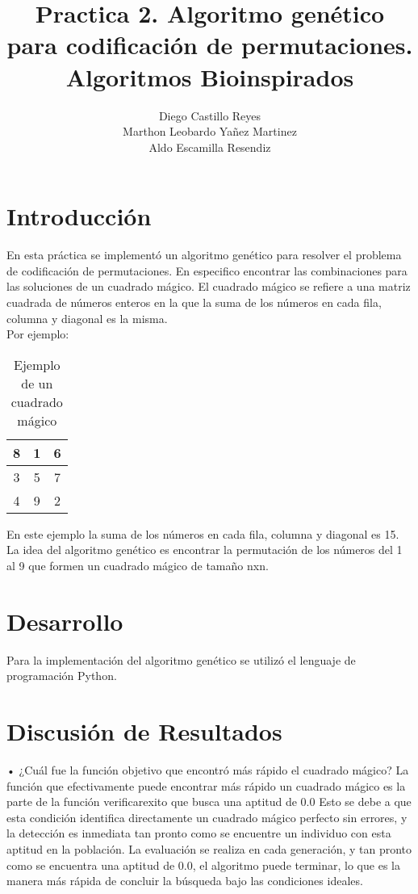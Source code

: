 \documentclass{report}
\title{\Huge{\textbf{Practica 2. Algoritmo genético para codificación de permutaciones.}}\\
\Large{\textbf{Algoritmos Bioinspirados}}}
\author{Diego Castillo Reyes\\Marthon Leobardo Yañez Martinez\\Aldo Escamilla Resendiz}
\begin{document}
    \maketitle
    \tableofcontents
    \newpage

    \section{Introducción}
    En esta práctica se implementó un algoritmo genético para resolver el problema de codificación de 
    permutaciones. En especifico encontrar las combinaciones para las soluciones de un cuadrado mágico.
    El cuadrado mágico se refiere a una matriz cuadrada de números enteros en la que la suma de los números 
    en cada fila, columna y diagonal es la misma.\\

    Por ejemplo: 
    \begin{table}[H]
        \centering
        \begin{tabular}{|c|c|c|}
            \hline
            8 & 1 & 6\\
            \hline
            3 & 5 & 7\\
            \hline
            4 & 9 & 2\\
            \hline
        \end{tabular}
        \caption{Ejemplo de un cuadrado mágico}
    \end{table}
    En este ejemplo la suma de los números en cada fila, columna y diagonal es 15.\\
    La idea del algoritmo genético es encontrar la permutación de los números del 
    1 al 9 que formen un cuadrado mágico de tamaño nxn.\\

    \section{Desarrollo}
    Para la implementación del algoritmo genético se utilizó el lenguaje de programación Python.
    
    \section{Discusión de Resultados}
    •  ¿Cuál fue la función objetivo que encontró más rápido el cuadrado mágico?
    La función que efectivamente puede encontrar más rápido un cuadrado mágico es la parte 
    de la función verificarexito que busca una aptitud de 0.0
    Esto se debe a que esta condición identifica directamente un cuadrado mágico perfecto sin errores, y la detección es inmediata 
    tan pronto como se encuentre un individuo con esta aptitud en la población. La evaluación se realiza en cada generación, 
    y tan pronto como se encuentra una aptitud de 0.0, el algoritmo puede terminar, lo que es la manera más rápida de concluir 
    la búsqueda bajo las condiciones ideales.
\end{document}
